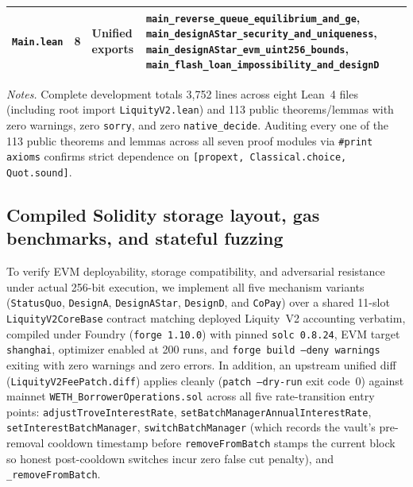 \begin{table}[t]
\begin{threeparttable}
\begin{tabular}{@{}l r >{\raggedright\arraybackslash}p{2.7cm} >{\raggedright\arraybackslash}p{8.5cm}@{}}
\addlinespace[3pt]
\texttt{Main.lean} & 8 & Unified exports &
{\scriptsize\texttt{main\_reverse\_queue\_equilibrium\_and\_ge}, \texttt{main\_designAStar\_security\_and\_uniqueness}, \texttt{main\_designAStar\_evm\_uint256\_bounds}, \texttt{main\_flash\_loan\_impossibility\_and\_designD}} \\
\bottomrule
\end{tabular}
\begin{tablenotes}[flushleft]
\footnotesize
\item \textit{Notes.} Complete development totals 3,752 lines across eight Lean~4 files (including root import \texttt{LiquityV2.lean}) and 113 public theorems/lemmas with zero warnings, zero \texttt{sorry}, and zero \texttt{native\_decide}. Auditing every one of the 113 public theorems and lemmas across all seven proof modules via \texttt{\#print axioms} confirms strict dependence on \texttt{[propext, Classical.choice, Quot.sound]}.
\end{tablenotes}
\end{threeparttable}
\end{table}

\subsection{Compiled Solidity storage layout, gas benchmarks, and stateful fuzzing}\label{subsec:solidity}

To verify EVM deployability, storage compatibility, and adversarial resistance under actual 256-bit execution, we implement all five mechanism variants (\texttt{StatusQuo}, \texttt{DesignA}, \texttt{DesignAStar}, \texttt{DesignD}, and \texttt{CoPay}) over a shared 11-slot \texttt{LiquityV2CoreBase} contract matching deployed Liquity~V2 accounting verbatim, compiled under Foundry (\texttt{forge 1.10.0}) with pinned \texttt{solc 0.8.24}, EVM target \texttt{shanghai}, optimizer enabled at 200 runs, and \texttt{forge build --deny warnings} exiting with zero warnings and zero errors. In addition, an upstream unified diff (\texttt{LiquityV2FeePatch.diff}) applies cleanly (\texttt{patch --dry-run} exit code~0) against mainnet \texttt{WETH\_Borrower\allowbreak Operations.sol} across all five rate-transition entry points: \texttt{adjustTrove\allowbreak InterestRate}, \texttt{setBatchManager\allowbreak AnnualInterestRate}, \texttt{setInterest\allowbreak BatchManager}, \texttt{switchBatch\allowbreak Manager} (which records the vault's pre-removal cooldown timestamp before \texttt{removeFromBatch} stamps the current block so honest post-cooldown switches incur zero false cut penalty), and \texttt{\_removeFromBatch}.

